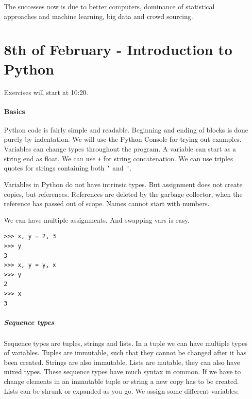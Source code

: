 \documentclass{article}
\begin{document}
The successes now is due to better computers, dominance of statistical
approaches and machine learning, big data and crowd sourcing.

\section{8th of February - Introduction to Python}

Exercises will start at 10:20.
\paragraph{Basics}
Python code is fairly simple and readable. Beginning and ending of blocks is
done purely by indentation. We will use the Python Console for trying out
examples. Variables can change types throughout the program. A variable can
start as a string end as float. We can use \texttt{+} for string concatenation.
We can use triples quotes for strings containing both \texttt{'} and \texttt{"}.

Variables in Python do not have intrinsic types. But assignment does not create
copies, but references. References are deleted by the garbage collector, when
the reference has passed out of scope. Names cannot start with numbers.

We can have multiple assignments. And swapping vars is easy.
\begin{lstlisting}
>>> x, y = 2, 3
>>> y
3
>>> x, y = y, x
>>> y
2
>>> x
3
\end{lstlisting}

\subparagraph{Sequence types}
Sequence types are tuples, strings and lists. In a tuple we can have multiple
types of variables. Tuples are immutable, such that they cannot be changed after
it has been created. Strings are also immutable. Lists are mutable, they can
also have mixed types.
These sequence types have much syntax in common. If we have to change elements
in an immutable tuple or string a new copy has to be created. Lists can be
shrunk or expanded as you go. We assign some different variables:
\end{document}
